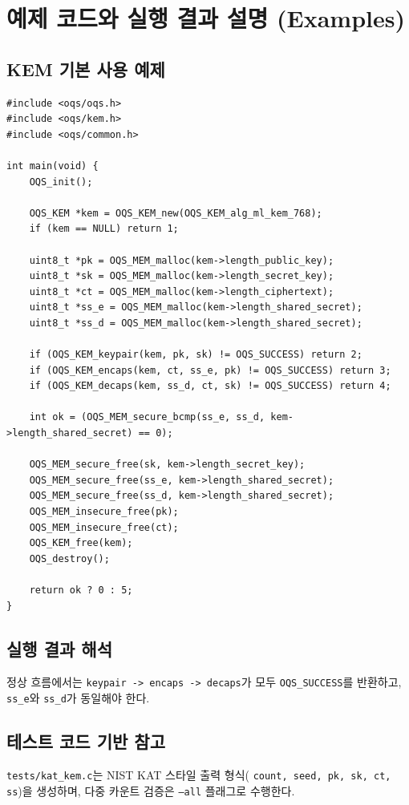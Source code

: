 \section{예제 코드와 실행 결과 설명 (Examples)}

\subsection{KEM 기본 사용 예제}
\begin{lstlisting}[style=cstyle,caption={ML-KEM-768 encaps/decaps 최소 예제}]
#include <oqs/oqs.h>
#include <oqs/kem.h>
#include <oqs/common.h>

int main(void) {
    OQS_init();

    OQS_KEM *kem = OQS_KEM_new(OQS_KEM_alg_ml_kem_768);
    if (kem == NULL) return 1;

    uint8_t *pk = OQS_MEM_malloc(kem->length_public_key);
    uint8_t *sk = OQS_MEM_malloc(kem->length_secret_key);
    uint8_t *ct = OQS_MEM_malloc(kem->length_ciphertext);
    uint8_t *ss_e = OQS_MEM_malloc(kem->length_shared_secret);
    uint8_t *ss_d = OQS_MEM_malloc(kem->length_shared_secret);

    if (OQS_KEM_keypair(kem, pk, sk) != OQS_SUCCESS) return 2;
    if (OQS_KEM_encaps(kem, ct, ss_e, pk) != OQS_SUCCESS) return 3;
    if (OQS_KEM_decaps(kem, ss_d, ct, sk) != OQS_SUCCESS) return 4;

    int ok = (OQS_MEM_secure_bcmp(ss_e, ss_d, kem->length_shared_secret) == 0);

    OQS_MEM_secure_free(sk, kem->length_secret_key);
    OQS_MEM_secure_free(ss_e, kem->length_shared_secret);
    OQS_MEM_secure_free(ss_d, kem->length_shared_secret);
    OQS_MEM_insecure_free(pk);
    OQS_MEM_insecure_free(ct);
    OQS_KEM_free(kem);
    OQS_destroy();

    return ok ? 0 : 5;
}
\end{lstlisting}

\subsection{실행 결과 해석}
정상 흐름에서는 \texttt{keypair -> encaps -> decaps}가 모두 \texttt{OQS\_SUCCESS}를 반환하고,
\texttt{ss\_e}와 \texttt{ss\_d}가 동일해야 한다.

\subsection{테스트 코드 기반 참고}
\texttt{tests/kat\_kem.c}는 NIST KAT 스타일 출력 형식(
\texttt{count, seed, pk, sk, ct, ss})을 생성하며,
다중 카운트 검증은 \texttt{--all} 플래그로 수행한다.
